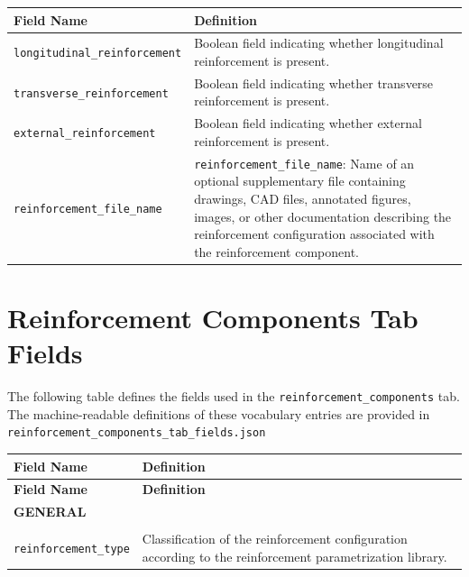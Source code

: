 \documentclass[11pt]{book}
\begin{document}
{\begin{longtable}{p{}p{}}
\hline
\textbf{Field Name} & \textbf{Definition} \\
\hline
\endhead

\texttt{longitudinal\_reinforcement} &
Boolean field indicating whether longitudinal reinforcement is present. \\

\texttt{transverse\_reinforcement} &
Boolean field indicating whether transverse reinforcement is present. \\

\texttt{external\_reinforcement} &
Boolean field indicating whether external reinforcement is present. \\

\texttt{reinforcement\_file\_name} & \texttt{reinforcement\_file\_name}: Name of an optional supplementary file containing drawings, CAD files, annotated figures, images, or other documentation describing the reinforcement configuration associated with the reinforcement component. \\

\hline
\end{longtable}



\section{Reinforcement Components Tab Fields}
\label{vocab:reinforcement_fields_tab}

The following table defines the fields used in the \texttt{reinforcement\_components} tab. 
The machine-readable definitions of these vocabulary entries are provided in \texttt{reinforcement\_components\_tab\_fields.json}

\begin{longtable}{p{}p{}}
\hline
\textbf{Field Name} & \textbf{Definition} \\
\hline
\endfirsthead

\hline
\textbf{Field Name} & \textbf{Definition} \\
\hline
\endhead

\multicolumn{2}{l}{\textbf{GENERAL}}\\
\hline

 \\

\texttt{reinforcement\_type} &
Classification of the reinforcement configuration according to the reinforcement parametrization library. \\


\end{longtable}}
\end{document}
